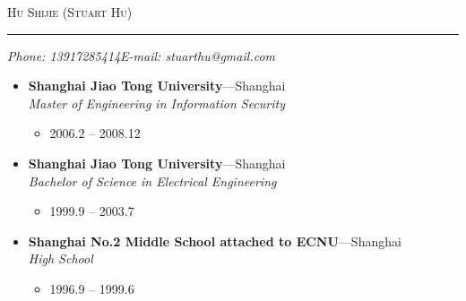 \documentclass[11pt,oneside]{article}
\makeatletter
\newcommand{\name}{Hu Shijie (Stuart Hu)}
\newcommand{\phone}{Phone: 13917285414}
\newcommand{\email}{E-mail: stuarthu@gmail.com}
\newcommand{\bigname}[1]{
    \begin{center}\selectfont\Huge\scshape#1\end{center}
}
\newenvironment{ressection}[1]{
    \vspace{4pt}
    \begin{itemize}
    \vspace{3pt}
}{
    \end{itemize}
}
\newcommand{\ressubitem}[1]{
    \vspace{-1pt}
    \item \begin{flushleft} #1 \end{flushleft}
}
\newcommand{\resbigitem}[3]{
    \vspace{-5pt}
    \item
    \textbf{#1}---#2 \\
    \textit{#3}
}
\newenvironment{ressubsec}[3]{
    \resbigitem{#1}{#2}{#3}
    \vspace{-2pt}
    \begin{itemize}
}{
    \end{itemize}
}
\makeatother
\begin{document}
\bigname{\name}

\vspace{-8pt} \rule{\textwidth}{1pt}

\vspace{-1pt} {\small\itshape \phone \hfill \email}

\vspace{8 pt}


\begin{ressection}{Education}

    \begin{ressubsec}{Shanghai Jiao Tong University}{Shanghai}{Master of Engineering in Information Security}
        \ressubitem{2006.2 -- 2008.12}
    \end{ressubsec}

    \begin{ressubsec}{Shanghai Jiao Tong University}{Shanghai}{Bachelor of Science in Electrical Engineering}
        \ressubitem{1999.9 -- 2003.7}
    \end{ressubsec}

    \begin{ressubsec}{Shanghai No.2 Middle School attached to ECNU}{Shanghai}{High School}
        \ressubitem{1996.9 -- 1999.6}
    \end{ressubsec}

\end{ressection}
\end{document}

